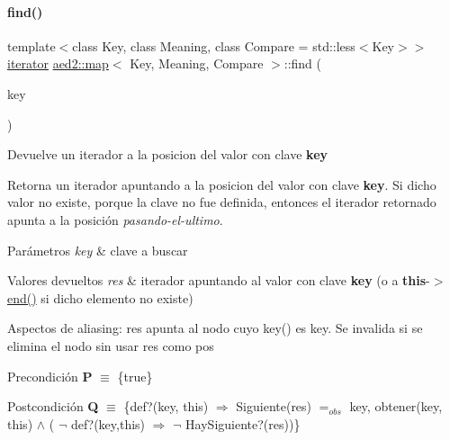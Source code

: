 \paragraph{\texorpdfstring{find()}{find()}\hspace{0.1cm}{\footnotesize\ttfamily [1/2]}}
{\footnotesize\ttfamily template$<$class Key, class Meaning, class Compare = std\+::less$<$\+Key$>$$>$ \\
\hyperlink{classaed2_1_1map_1_1iterator}{iterator} \hyperlink{classaed2_1_1map}{aed2\+::map}$<$ Key, Meaning, Compare $>$\+::find (\begin{DoxyParamCaption}\item[{const Key \&}]{key }\end{DoxyParamCaption})\hspace{0.3cm}{\ttfamily [inline]}}



Devuelve un iterador a la posicion del valor con clave {\bfseries key} 

Retorna un iterador apuntando a la posicion del valor con clave {\bfseries key}. Si dicho valor no existe, porque la clave no fue definida, entonces el iterador retornado apunta a la posición {\itshape pasando-\/el-\/ultimo}.


\begin{DoxyParams}{Parámetros}
{\em key} & clave a buscar \\
\hline
\end{DoxyParams}

\begin{DoxyRetVals}{Valores devueltos}
{\em res} & iterador apuntando al valor con clave {\bfseries key} (o a {\bfseries this}-\/$>$\hyperlink{classaed2_1_1map_a76023e6a56cb625513e1b5ea028bf983_a76023e6a56cb625513e1b5ea028bf983}{end()} si dicho elemento no existe)\\
\hline
\end{DoxyRetVals}
\begin{DoxyParagraph}{Aspectos de aliasing\+:}
res apunta al nodo cuyo key() es key. Se invalida si se elimina el nodo sin usar res como pos
\end{DoxyParagraph}
\begin{DoxyPrecond}{Precondición}
{\bfseries P} $\equiv$ \{true\} 
\end{DoxyPrecond}
\begin{DoxyPostcond}{Postcondición}
{\bfseries Q} $\equiv$ \{def?(key, this) $\Rightarrow$ Siguiente(res) $=_{obs}$  key, obtener(key, this)  $\land$ ( $\lnot$ def?(key,this) $\Rightarrow$ $\lnot$ Hay\+Siguiente?(res))\}
\end{DoxyPostcond}

